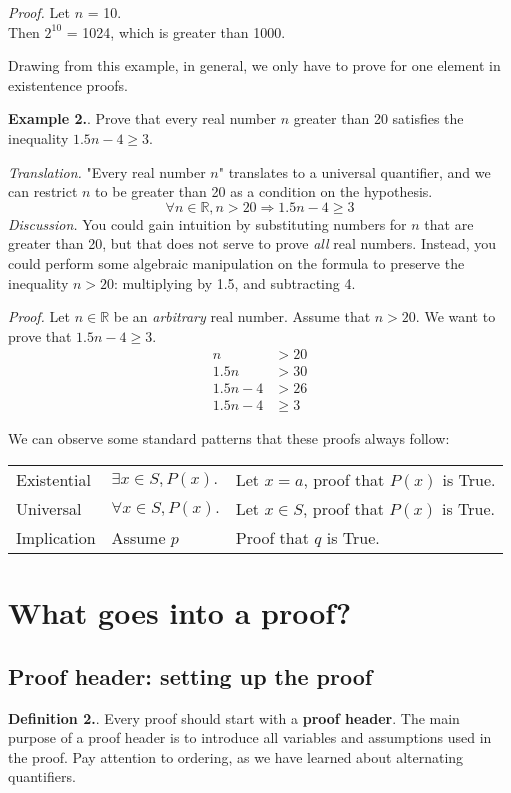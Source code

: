 \documentclass{article}
\newcounter{defcount}
\newcounter{excount}
\newcommand\df{\stepcounter{defcount} \textbf{Definition 2.\thedefcount}. }
\newcommand\ex{\stepcounter{excount} \textbf{Example 2.\theexcount}. }
\begin{document}
\textit{Proof.} Let $n$ = 10. \\
Then $2^ {10}$ = 1024, which is greater than 1000.

Drawing from this example, in general, we only have to prove for one element in 
existentence proofs. 

\newpage
\ex Prove that every real number $n$ greater than 20 satisfies the inequality 
$1.5n - 4 \geq 3$. 

\textit{Translation.} "Every real number $n$" translates to a universal 
quantifier, and we can restrict $n$ to be greater than 20 as a condition on 
the hypothesis. 
$$\forall n \in \mathbb{R}, n > 20 \Rightarrow 1.5n - 4 \geq 3$$
\textit{Discussion.} You could gain intuition by substituting numbers for 
$n$ that are greater than 20, but that does not serve to prove \textit{all} 
real numbers. Instead, you could perform some algebraic manipulation on the 
formula to preserve the inequality $n > 20$: multiplying by 1.5, and 
subtracting 4. 

\textit{Proof.} Let $n \in \mathbb{R}$ be an \textit{arbitrary} real number. 
Assume that $n > 20$. We want to prove that $1.5n - 4 \geq 3$.
\begin{align*}
    n &> 20\\
    1.5n &> 30\\
    1.5n - 4 &> 26\\
    1.5n - 4 &\geq 3
\end{align*}

We can observe some standard patterns that these proofs always follow:

\begin{center}
\begin{tabular}{|l l l|}
    Existential & $\exists x \in S, P(x).$ & Let $x = a$, proof that $P(x)$ is True.\\ 
    Universal & $\forall x \in S, P(x).$ & Let $x \in S$, proof that $P(x)$ is True.\\
    Implication & Assume $p$ & Proof that $q$ is True. 
\end{tabular}
\end{center}

\section{What goes into a proof?}
\subsection{Proof header: setting up the proof}
\df Every proof should start with a \textbf{proof header}. The main purpose 
of a proof header is to introduce all variables and assumptions used in the 
proof. Pay attention to ordering, as we have learned about alternating 
quantifiers.
\end{document}
